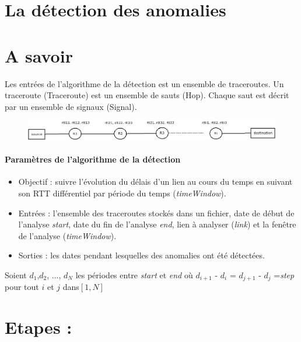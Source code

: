 \documentclass[]{report}
\title{}
\author{}
\begin{document}
\maketitle

\section{La détection des anomalies}
\section{A savoir}

Les entrées de l'algorithme de la détection est un ensemble de traceroutes. Un traceroute (Traceroute) est un ensemble de sauts (Hop). Chaque saut est décrit par un ensemble de signaux (Signal). 

\begin{figure}
	\centering
	\includegraphics[width=1\linewidth]{illustrations/traceroute}
	\caption{}
	\label{fig:traceroute}
\end{figure}

\paragraph{Paramètres de l'algorithme de la détection}

\begin{itemize}
		\item  Objectif : suivre l'évolution du délais d'un lien au cours du temps en suivant son RTT différentiel par période du temps (\textit{timeWindow}).
	\item Entrées : l'ensemble des traceroutes stockés dans un fichier, date de début de l'analyse \textit{start}, date du fin de l'analyse \textit{end}, lien à analyser (\textit{link}) et la fenêtre de l'analyse (\textit{timeWindow}).
	\item Sorties : les dates pendant lesquelles des anomalies ont été détectées.
\end{itemize}

Soient $ d_1 $,$  d_2 $, ..., $ d_N $ les périodes entre \textit{start} et \textit{end} où $  d_{i+1} $ - $  d_{i} $ = $  d_{j+1} $ - $  d_{j} $ =\textit{step} pour tout $ i $ et $ j $ dans$  [1,N] $
\section{Etapes : }
\end{document}
